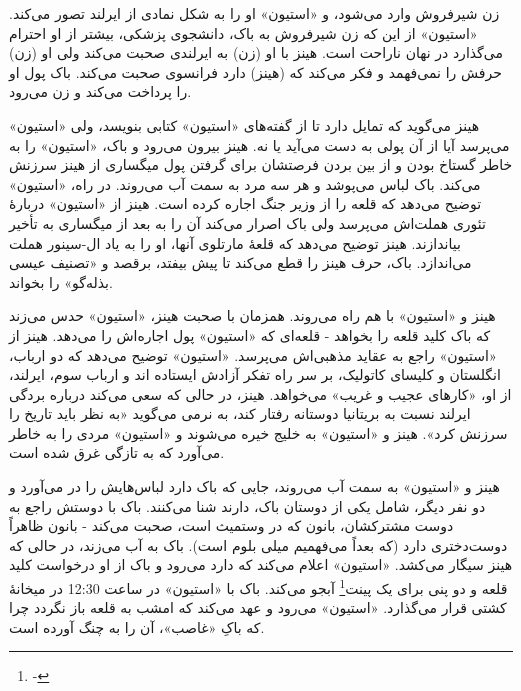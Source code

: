 \documentclass[12pt]{book}
\newcommand{\noun}[1]{«{#1}»}
\begin{document}
    زن شیرفروش وارد می‌شود، و \noun{استیون} او را به شکل نمادی از ایرلند تصور می‌کند. \noun{استیون} از این که زن شیرفروش به باک، دانشجوی پزشکی، بیشتر از او احترام می‌گذارد در نهان ناراحت است. هینز با او (زن) به ایرلندی صحبت می‌کند ولی او (زن) حرفش را نمی‌فهمد و فکر می‌کند که (هینز) دارد فرانسوی صحبت می‌کند. باک پول او را پرداخت می‌کند و زن می‌رود.

    هینز می‌گوید که تمایل دارد تا از گفته‌های \noun{استیون} کتابی بنویسد، ولی \noun{استیون} می‌پرسد آیا از آن پولی به دست می‌آید یا نه. هینز بیرون می‌رود و باک، \noun{استیون} را به خاطر گستاخ بودن و از بین بردن فرصتشان برای گرفتن پول میگساری از هینز سرزنش می‌کند. باک لباس می‌پوشد و هر سه مرد به سمت آب می‌روند. در راه، \noun{استیون} توضیح می‌دهد که قلعه را از وزیر جنگ اجاره کرده است. هینز از \noun{استیون} دربارۀ تئوری هملت‌اش می‌پرسد ولی باک اصرار می‌کند آن را به بعد از میگساری به تأخیر بیاندازند. هینز توضیح می‌دهد که قلعۀ مارتلوی آنها، او را به یاد ال-سینور هملت می‌اندازد. باک، حرف هینز را قطع می‌کند تا پیش بیفتد، برقصد و «تصنیف عیسی بذله‌گو» را بخواند.

    هینز و \noun{استیون} با هم راه می‌روند. همزمان با صحبت هینز، \noun{استیون} حدس می‌زند که باک کلید قلعه را بخواهد - قلعه‌ای که \noun{استیون} پول اجاره‌اش را می‌دهد. هینز از \noun{استیون} راجع به عقاید مذهبی‌اش می‌پرسد. \noun{استیون} توضیح می‌دهد که دو ارباب، انگلستان و کلیسای کاتولیک، بر سر راه تفکر آزادش ایستاده اند و ارباب سوم، ایرلند، از او، «کارهای عجیب و غریب» می‌خواهد. هینز، در حالی که سعی می‌کند درباره بردگی ایرلند نسبت به بریتانیا دوستانه رفتار کند، به نرمی می‌گوید «به نظر باید تاریخ را سرزنش کرد». هینز و \noun{استیون} به خلیج خیره می‌شوند و \noun{استیون} مردی را به خاطر می‌آورد که به تازگی غرق شده است.

    هینز و \noun{استیون} به سمت آب می‌روند، جایی که باک دارد لباس‌هایش را در می‌آورد و دو نفر دیگر، شامل یکی از دوستان باک، دارند شنا می‌کنند. باک با دوستش راجع به دوست مشترکشان، بانون که در وستمیث است، صحبت می‌کند - بانون ظاهراً دوست‌دختری دارد (که بعداً می‌فهمیم میلی بلوم است). باک به آب می‌زند، در حالی که هینز سیگار می‌کشد. \noun{استیون} اعلام می‌کند که دارد می‌رود و باک از او درخواست کلید قلعه و دو پنی برای یک پینت\footnote{-} آبجو می‌کند. باک با \noun{استیون} در ساعت 12:30 در میخانۀ کشتی قرار می‌گذارد. \noun{استیون} می‌رود و عهد می‌کند که امشب به قلعه باز نگردد چرا که باکِ «غاصب»، آن را به چنگ آورده است.
\end{document}
